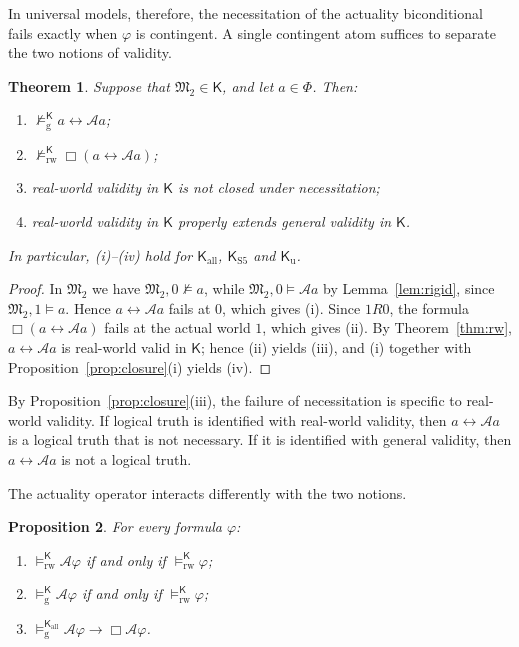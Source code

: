 \documentclass[11pt]{amsart}
\theoremstyle{plain}
\newtheorem{theorem}{Theorem}[section]
\newtheorem{proposition}[theorem]{Proposition}
\theoremstyle{definition}
\theoremstyle{remark}
\newcommand{\Act}{\mathcal{A}}
\newcommand{\Mod}{\mathfrak{M}}
\newcommand{\Kl}{\mathsf{K}}
\newcommand{\RWv}[1]{\models^{#1}_{\mathrm{rw}}}
\newcommand{\Gv}[1]{\models^{#1}_{\mathrm{g}}}
\newcommand{\nRWv}[1]{\not\models^{#1}_{\mathrm{rw}}}
\newcommand{\nGv}[1]{\not\models^{#1}_{\mathrm{g}}}
\newcommand{\Two}{\Mod_2}
\begin{document}
In universal models, therefore, the necessitation of the actuality
biconditional fails exactly when $\varphi$ is contingent. A single
contingent atom suffices to separate the two notions of validity.

\begin{theorem}
\label{thm:separation}
Suppose that $\Two \in \Kl$, and let $a \in \Phi$. Then:
\begin{enumerate}[label=(\roman*)]
\item $\nGv{\Kl} a \leftrightarrow \Act a$;
\item $\nRWv{\Kl} \Box(a \leftrightarrow \Act a)$;
\item real-world validity in $\Kl$ is not closed under necessitation;
\item real-world validity in $\Kl$ properly extends general validity
  in $\Kl$.
\end{enumerate}
In particular, \textup{(i)--(iv)} hold for $\Kl_{\mathrm{all}}$,
$\Kl_{\mathrm{S5}}$ and $\Kl_{\mathrm{u}}$.
\end{theorem}

\begin{proof}
In $\Two$ we have $\Two, 0 \not\models a$, while
$\Two, 0 \models \Act a$ by Lemma~\ref{lem:rigid}, since
$\Two, 1 \models a$. Hence $a \leftrightarrow \Act a$ fails at $0$,
which gives (i). Since $1 R 0$, the formula
$\Box(a \leftrightarrow \Act a)$ fails at the actual world $1$, which
gives (ii). By Theorem~\ref{thm:rw}, $a \leftrightarrow \Act a$ is
real-world valid in $\Kl$; hence (ii) yields (iii), and (i) together
with Proposition~\ref{prop:closure}(i) yields (iv).
\end{proof}

By Proposition~\ref{prop:closure}(iii), the failure of necessitation is
specific to real-world validity. If logical truth is identified with
real-world validity, then $a \leftrightarrow \Act a$ is a logical truth
that is not necessary. If it is identified with general validity, then
$a \leftrightarrow \Act a$ is not a logical truth.

The actuality operator interacts differently with the two notions.

\begin{proposition}
\label{prop:inert}
For every formula $\varphi$:
\begin{enumerate}[label=(\roman*)]
\item $\RWv{\Kl} \Act\varphi$ if and only if $\RWv{\Kl} \varphi$;
\item $\Gv{\Kl} \Act\varphi$ if and only if $\RWv{\Kl} \varphi$;
\item $\Gv{\Kl_{\mathrm{all}}} \Act\varphi \to \Box\Act\varphi$.
\end{enumerate}
\end{proposition}
\end{document}
